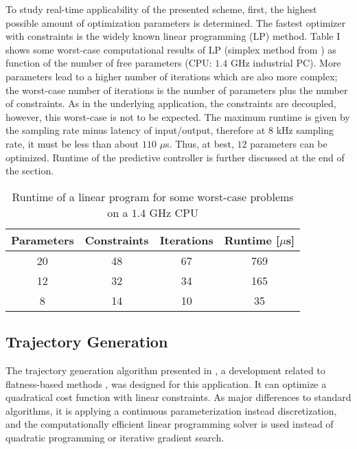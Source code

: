 \documentclass[a4paper,11pt,fleqn]{article}
\begin{document}
To study real-time applicability of the presented scheme, first, the highest possible amount of optimization parameters is determined. The fastest optimizer with constraints is the widely known linear programming (LP) method. Table I shows some worst-case computational results of LP (simplex method from \cite{LPalg}) as function of the number of free parameters (CPU: $1.4$ GHz industrial PC). More parameters lead to a higher number of iterations which are also more complex; the worst-case number of iterations is the number of parameters plus the number of constraints. As in the underlying application, the constraints are decoupled, however, this worst-case is not to be expected. The maximum runtime is given by the sampling rate minus latency of input/output, therefore at $8$ kHz sampling rate, it must be less than about $110$ $\mu$s. Thus, at best, $12$ parameters can be optimized. Runtime of the predictive controller is further discussed at the end of the section.

\begin{table}[!htb]
\renewcommand{\arraystretch}{1.0}
\caption{Runtime of a linear program for some worst-case problems on a $1.4$ GHz CPU}
\label{tbl:computer}
\centering
\begin{tabular}{|c|c|c|c|}
\hline
Parameters   &  Constraints & Iterations &  Runtime [$\mu$s] \\
\hline
  20         &   48         &   67       &   769  \\
\hline
  12         &   32         &   34       &   165  \\
\hline
  8          &   14         &   10       &   35  \\
\hline
\end{tabular}
\end{table}



\subsection*{Trajectory Generation}

The trajectory generation algorithm presented in \cite{SK10}, a development related to flatness-based methods \cite{Guay}, was designed for this application. It can optimize a quadratical cost function with linear constraints. As major differences to standard algorithms, it is applying a continuous parameterization instead discretization, and the computationally efficient linear programming solver is used instead of quadratic programming or iterative gradient search.
\end{document}

